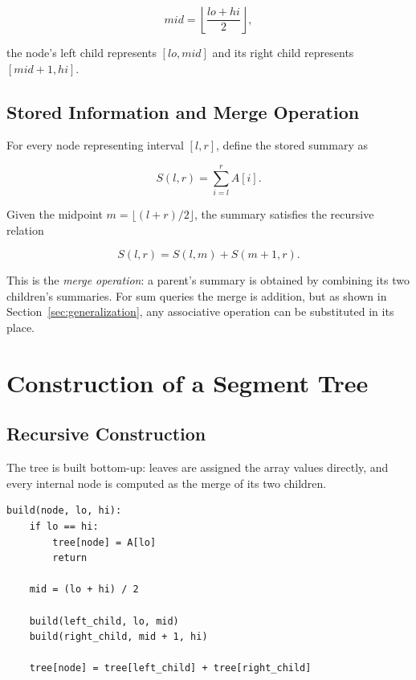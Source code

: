 \documentclass[11pt]{article}
\begin{document}
\begin{equation}
mid = \left\lfloor \frac{lo+hi}{2} \right\rfloor,
\end{equation}

the node's left child represents $[lo, mid]$ and its right child represents $[mid+1, hi]$.

\subsection{Stored Information and Merge Operation}
For every node representing interval $[l,r]$, define the stored summary as

\begin{equation}
S(l,r) = \sum_{i=l}^{r} A[i].
\end{equation}

Given the midpoint $m = \lfloor (l+r)/2 \rfloor$, the summary satisfies the recursive relation

\begin{equation}
S(l,r) = S(l,m) + S(m+1,r).
\label{eq:merge}
\end{equation}

This is the \emph{merge operation}: a parent's summary is obtained by combining its two children's summaries. For sum queries the merge is addition, but as shown in Section~\ref{sec:generalization}, any associative operation can be substituted in its place.

\section{Construction of a Segment Tree}

\subsection{Recursive Construction}
The tree is built bottom-up: leaves are assigned the array values directly, and every internal node is computed as the merge of its two children.

\begin{lstlisting}
build(node, lo, hi):
    if lo == hi:
        tree[node] = A[lo]
        return

    mid = (lo + hi) / 2

    build(left_child, lo, mid)
    build(right_child, mid + 1, hi)

    tree[node] = tree[left_child] + tree[right_child]
\end{lstlisting}
\end{document}
